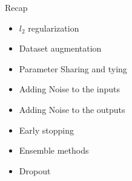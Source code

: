 \begin{frame}
	\vspace{4em}
	\begin{overlayarea}{\textwidth}{\textheight}
		\begin{block}{Recap}
			\begin{itemize}
				\item $l_2$ regularization
				\item Dataset augmentation
				\item Parameter Sharing and tying
				\item Adding Noise to the inputs
				\item Adding Noise to the outputs 
				\item Early stopping
				\item Ensemble methods
				\item Dropout
			\end{itemize}
		\end{block}
	\end{overlayarea}
\end{frame}
				
				
				
				

